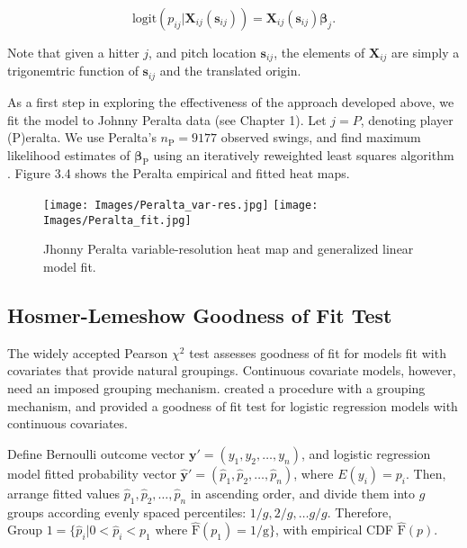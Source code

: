 \begin{equation}
\text{logit}(p_{ij}|\pmb{X}_{ij}(\pmb{s}_{ij})) = \pmb{X}_{ij}(\pmb{s}_{ij}) \pmb{\beta}_{j}.
\end{equation}


Note that given a hitter $j$, and pitch location $\pmb{s}_{ij}$, the elements of $\pmb{X}_{ij}$ are simply a trigonemtric function of $\pmb{s}_{ij}$ and the translated origin.

As a first step in exploring the effectiveness of the approach developed above, we fit the model to Johnny Peralta data (see Chapter 1). Let $j = P$, denoting player (P)eralta. We use Peralta's $n_{\text{P}} = 9177$ observed swings, and find maximum likelihood estimates of $\pmb{\beta}_{\text{P}}$ using an iteratively reweighted least squares algorithm \citep{Myers2012}. Figure 3.4 shows the Peralta empirical and fitted heat maps.
  \begin{figure}[!ht]
    \centering
    \texttt{[image: Images/Peralta\_var-res.jpg]}
    \texttt{[image: Images/Peralta\_fit.jpg]}
    \caption{Jhonny Peralta variable-resolution heat map and generalized linear model fit.}
  \end{figure}

\subsection{Hosmer-Lemeshow Goodness of Fit Test} %

The widely accepted Pearson $\chi^{2}$ test assesses goodness of fit for models fit with covariates that provide natural groupings. Continuous covariate models, however, need an imposed grouping mechanism. \cite{Hosmer2013} created a procedure with a grouping mechanism, and provided a goodness of fit test for logistic regression models with continuous covariates. 

Define Bernoulli outcome vector $\pmb{y}' = (y_{1}, y_{2}, \dots, y_{n})$, and logistic regression model fitted probability vector $\hat{\pmb{y}}' = (\hat{p}_{1}, \hat{p}_{2}, \dots, \hat{p}_{n})$, where $E(y_{i}) = p_{i}$. Then, arrange fitted values $\hat{p}_{1}, \hat{p}_{2}, \dots, \hat{p}_{n}$ in ascending order, and divide them into $g$ groups according evenly spaced percentiles: $1/g, 2/g, \dots g/g$. Therefore, $\text{Group 1} = \{\hat{p}_{i}|0 < \hat{p}_{i} < p_{1} \text{ where } \hat{\text{F}}(p_{1})=1/\text{g} \}$, with empirical CDF $\hat{\text{F}}(p)$. 

